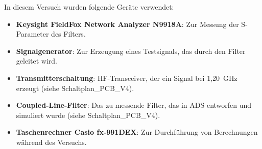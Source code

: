 In diesem Versuch wurden folgende Geräte verwendet:
\begin{itemize}
    \item \textbf{Keysight FieldFox Network Analyzer N9918A}: Zur Messung der S-Parameter des Filters.
    \item \textbf{Signalgenerator}: Zur Erzeugung eines Testsignals, das durch den Filter geleitet wird.
    \item \textbf{Transmitterschaltung}: HF-Transceiver, der ein Signal bei 1{,}20~GHz erzeugt (siehe Schaltplan\_PCB\_V4).
    \item \textbf{Coupled-Line-Filter}: Das zu messende Filter, das in ADS entworfen und simuliert wurde (siehe Schaltplan\_PCB\_V4).
    \item \textbf{Taschenrechner Casio fx-991DEX}: Zur Durchführung von Berechnungen während des Versuchs.
\end{itemize}
\clearpage